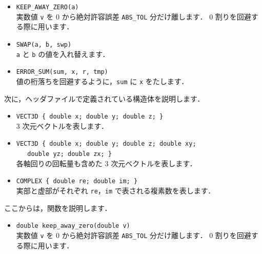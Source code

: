 \begin{itemize}
\item \verb|KEEP_AWAY_ZERO(a)| \ \\
実数値 \verb|v| を $0$ から絶対許容誤差 \verb|ABS_TOL| 分だけ離します．
$0$ 割りを回避する際に用います．

\item \verb|SWAP(a, b, swp)| \ \\
\verb|a| と \verb|b| の値を入れ替えます．

\item \verb|ERROR_SUM(sum, x, r, tmp)| \ \\
値の桁落ちを回避するように，\verb|sum| に \verb|x| をたします．

\end{itemize}

次に，ヘッダファイルで定義されている構造体を説明します．

\begin{itemize}
\item \verb|VECT3D { double x; double y; double z; }| \ \\
$3$ 次元ベクトルを表します．

\item \verb|VECT3D { double x; double y; double z; double xy; | \\
	\verb|   double yz; double zx; }| \ \\
各軸回りの回転量も含めた $3$ 次元ベクトルを表します．

\item \verb|COMPLEX { double re; double im; }| \ \\
実部と虚部がそれぞれ \verb|re|，\verb|im| で表される複素数を表します．

\end{itemize}

ここからは，関数を説明します．

\begin{itemize}
\item \verb|double keep_away_zero(double v)| \ \\
実数値 \verb|v| を $0$ から絶対許容誤差 \verb|ABS_TOL| 分だけ離します．
$0$ 割りを回避する際に用います．
\end{itemize}

